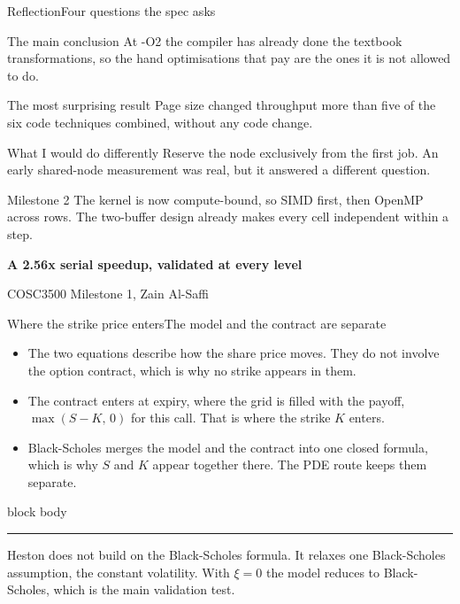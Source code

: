 \documentclass[aspectratio=169,11pt]{beamer}
\newcommand{\sigcallout}[1]{%
  \vfill
  \begin{beamercolorbox}[wd=\linewidth,sep=0.7em,rounded=true]{block body}
    {\color{sigblue}\rule{0.9ex}{0.9ex}}\hspace{0.5em}#1
  \end{beamercolorbox}%
}
\newcounter{siglastframe}
\newcommand{\sigbackupbegin}{\setcounter{siglastframe}{\value{framenumber}}}
\begin{document}
\begin{frame}{Reflection}{Four questions the spec asks}
  \small
  \begin{block}{The main conclusion}
    At -O2 the compiler has already done the textbook transformations, so
    the hand optimisations that pay are the ones it is not allowed to do.
  \end{block}
  \begin{exampleblock}{The most surprising result}
    Page size changed throughput more than five of the six code techniques
    combined, without any code change.
  \end{exampleblock}
  \begin{alertblock}{What I would do differently}
    Reserve the node exclusively from the first job. An early shared-node
    measurement was real, but it answered a different question.
  \end{alertblock}
  \begin{block}{Milestone 2}
    The kernel is now compute-bound, so SIMD first, then OpenMP across
    rows. The two-buffer design already makes every cell independent
    within a step.
  \end{block}
\end{frame}

\begin{frame}[plain]
  \vfill
  \centering
  {\Large\color{sigink}\bfseries A 2.56x serial speedup, validated at
    every level}
  \par\vspace{0.6em}
  {\color{sigslate} COSC3500 Milestone 1, Zain Al-Saffi}
  \vfill
\end{frame}


\appendix
\sigbackupbegin

\begin{frame}{Where the strike price enters}{The model and the contract are separate}
  \begin{itemize}
    \item The two equations describe how the share price moves. They do
      not involve the option contract, which is why no strike appears in
      them.
    \item The contract enters at expiry, where the grid is filled with the
      payoff, $\max(S - K,\, 0)$ for this call. That is where the strike
      $K$ enters.
    \item Black-Scholes merges the model and the contract into one closed
      formula, which is why $S$ and $K$ appear together there. The PDE
      route keeps them separate.
  \end{itemize}
  \sigcallout{Heston does not build on the Black-Scholes formula. It
    relaxes one Black-Scholes assumption, the constant volatility. With
    $\xi = 0$ the model reduces to Black-Scholes, which is the main
    validation test.}
\end{frame}
\end{document}
